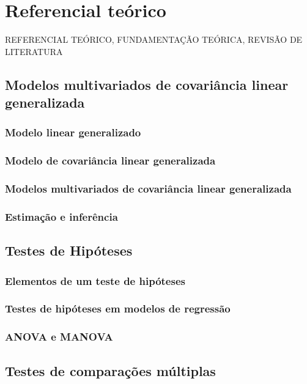\chapter{Referencial teórico}

REFERENCIAL TEÓRICO, FUNDAMENTAÇÃO TEÓRICA, REVISÃO DE LITERATURA


\section{Modelos multivariados de covariância linear generalizada}

\subsection{Modelo linear generalizado}
\subsection{Modelo de covariância linear generalizada}
\subsection{Modelos multivariados de covariância linear generalizada}
\subsection{Estimação e inferência}


\section{Testes de Hipóteses}
\subsection{Elementos de um teste de hipóteses}
\subsection{Testes de hipóteses em modelos de regressão}
\subsection{ANOVA e MANOVA}


\section{Testes de comparações múltiplas}

